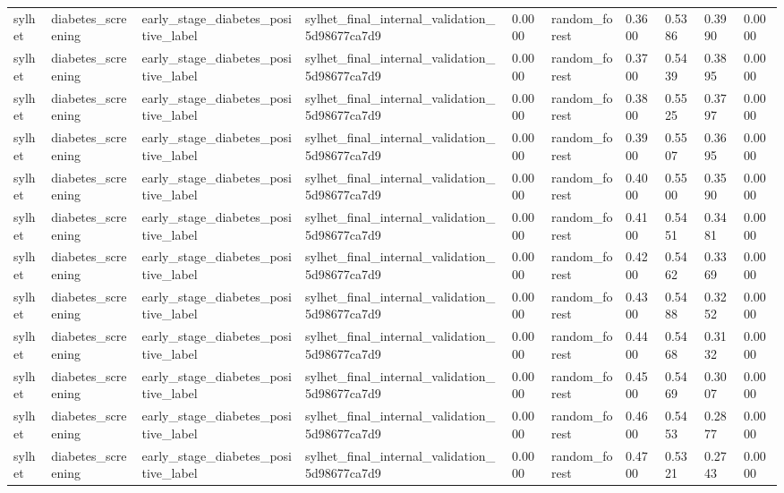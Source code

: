 \begin{tabular}{llllllllll}
sylhet & diabetes\_screening & early\_stage\_diabetes\_positive\_label & sylhet\_final\_internal\_validation\_5d98677ca7d9 & 0.0000 & random\_forest & 0.3600 & 0.5386 & 0.3990 & 0.0000 \\
sylhet & diabetes\_screening & early\_stage\_diabetes\_positive\_label & sylhet\_final\_internal\_validation\_5d98677ca7d9 & 0.0000 & random\_forest & 0.3700 & 0.5439 & 0.3895 & 0.0000 \\
sylhet & diabetes\_screening & early\_stage\_diabetes\_positive\_label & sylhet\_final\_internal\_validation\_5d98677ca7d9 & 0.0000 & random\_forest & 0.3800 & 0.5525 & 0.3797 & 0.0000 \\
sylhet & diabetes\_screening & early\_stage\_diabetes\_positive\_label & sylhet\_final\_internal\_validation\_5d98677ca7d9 & 0.0000 & random\_forest & 0.3900 & 0.5507 & 0.3695 & 0.0000 \\
sylhet & diabetes\_screening & early\_stage\_diabetes\_positive\_label & sylhet\_final\_internal\_validation\_5d98677ca7d9 & 0.0000 & random\_forest & 0.4000 & 0.5500 & 0.3590 & 0.0000 \\
sylhet & diabetes\_screening & early\_stage\_diabetes\_positive\_label & sylhet\_final\_internal\_validation\_5d98677ca7d9 & 0.0000 & random\_forest & 0.4100 & 0.5451 & 0.3481 & 0.0000 \\
sylhet & diabetes\_screening & early\_stage\_diabetes\_positive\_label & sylhet\_final\_internal\_validation\_5d98677ca7d9 & 0.0000 & random\_forest & 0.4200 & 0.5462 & 0.3369 & 0.0000 \\
sylhet & diabetes\_screening & early\_stage\_diabetes\_positive\_label & sylhet\_final\_internal\_validation\_5d98677ca7d9 & 0.0000 & random\_forest & 0.4300 & 0.5488 & 0.3252 & 0.0000 \\
sylhet & diabetes\_screening & early\_stage\_diabetes\_positive\_label & sylhet\_final\_internal\_validation\_5d98677ca7d9 & 0.0000 & random\_forest & 0.4400 & 0.5468 & 0.3132 & 0.0000 \\
sylhet & diabetes\_screening & early\_stage\_diabetes\_positive\_label & sylhet\_final\_internal\_validation\_5d98677ca7d9 & 0.0000 & random\_forest & 0.4500 & 0.5469 & 0.3007 & 0.0000 \\
sylhet & diabetes\_screening & early\_stage\_diabetes\_positive\_label & sylhet\_final\_internal\_validation\_5d98677ca7d9 & 0.0000 & random\_forest & 0.4600 & 0.5453 & 0.2877 & 0.0000 \\
sylhet & diabetes\_screening & early\_stage\_diabetes\_positive\_label & sylhet\_final\_internal\_validation\_5d98677ca7d9 & 0.0000 & random\_forest & 0.4700 & 0.5321 & 0.2743 & 0.0000 \\

\end{tabular}
